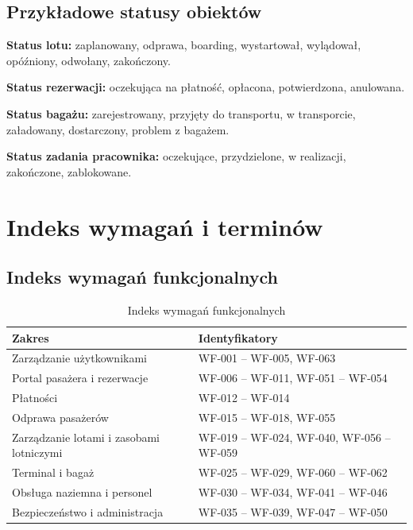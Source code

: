 \documentclass[12pt,a4paper,oneside]{report}
\begin{document}
\section{Przykładowe statusy obiektów}
\textbf{Status lotu:} zaplanowany, odprawa, boarding, wystartował, wylądował, opóźniony, odwołany, zakończony.

\textbf{Status rezerwacji:} oczekująca na płatność, opłacona, potwierdzona, anulowana.

\textbf{Status bagażu:} zarejestrowany, przyjęty do transportu, w transporcie, załadowany, dostarczony, problem z bagażem.

\textbf{Status zadania pracownika:} oczekujące, przydzielone, w realizacji, zakończone, zablokowane.

\chapter{Indeks wymagań i terminów}

\section{Indeks wymagań funkcjonalnych}
\begin{longtable}{|p{5cm}|p{8cm}|}
\caption{Indeks wymagań funkcjonalnych}\label{tab:indeks-wf}\\\hline
\rowcolor{lightblue}\textbf{Zakres} & \textbf{Identyfikatory}\\\hline
Zarządzanie użytkownikami & WF-001 -- WF-005, WF-063\\\hline
Portal pasażera i rezerwacje & WF-006 -- WF-011, WF-051 -- WF-054\\\hline
Płatności & WF-012 -- WF-014\\\hline
Odprawa pasażerów & WF-015 -- WF-018, WF-055\\\hline
Zarządzanie lotami i zasobami lotniczymi & WF-019 -- WF-024, WF-040, WF-056 -- WF-059\\\hline
Terminal i bagaż & WF-025 -- WF-029, WF-060 -- WF-062\\\hline
Obsługa naziemna i personel & WF-030 -- WF-034, WF-041 -- WF-046\\\hline
Bezpieczeństwo i administracja & WF-035 -- WF-039, WF-047 -- WF-050\\\hline
\end{longtable}
\end{document}

